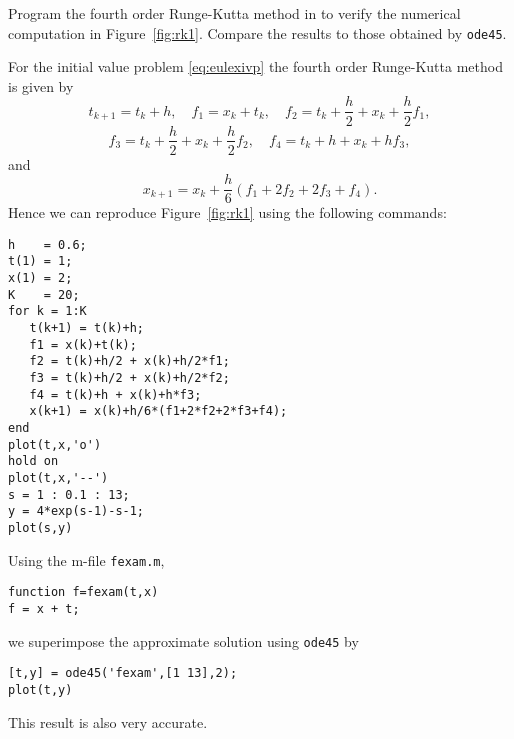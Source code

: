 \documentclass{ximera}
\begin{document}
\begin{computerExercise} \label{c15.1.8}
Program the fourth order Runge-Kutta method in \Matlab
to verify the numerical computation in Figure~\ref{fig:rk1}.
Compare the results to those obtained by {\tt ode45}.

\begin{solution}
For the initial value problem \eqref{eq:eulexivp} the
fourth order Runge-Kutta method is given by
\[
t_{k+1} = t_k+h,\quad f_1= x_k + t_k,\quad
f_2 = t_k+\frac{h}{2} + x_k + \frac{h}{2}f_1,
\]
\[
f_3 = t_k+\frac{h}{2} + x_k + \frac{h}{2}f_2,\quad f_4 = t_k+h+x_k+hf_3,
\]
and
\[
x_{k+1} = x_k + \frac{h}{6}(f_1+2f_2+2f_3+f_4).
\]
Hence we can reproduce Figure~\ref{fig:rk1} using the following
\Matlab commands:
\begin{verbatim}
h    = 0.6;
t(1) = 1;
x(1) = 2;
K    = 20;
for k = 1:K
   t(k+1) = t(k)+h;
   f1 = x(k)+t(k);
   f2 = t(k)+h/2 + x(k)+h/2*f1;
   f3 = t(k)+h/2 + x(k)+h/2*f2;
   f4 = t(k)+h + x(k)+h*f3;
   x(k+1) = x(k)+h/6*(f1+2*f2+2*f3+f4);
end
plot(t,x,'o')
hold on
plot(t,x,'--')
s = 1 : 0.1 : 13;
y = 4*exp(s-1)-s-1;
plot(s,y)
\end{verbatim}
Using the m-file {\tt fexam.m},
\begin{verbatim}
function f=fexam(t,x)
f = x + t;
\end{verbatim}
we superimpose the approximate solution using {\tt ode45} by
\begin{verbatim}
[t,y] = ode45('fexam',[1 13],2);
plot(t,y)
\end{verbatim}
This result is also very accurate.

\end{solution}
\end{computerExercise}
\end{document}
